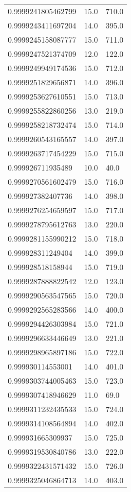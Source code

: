 \begin{center}
\begin{supertabular}[H]{p{0.30\textwidth}p{0.05\textwidth}p{0.05\textwidth}}
0.9999241805462799 & 15.0 & 710.0 \\ 
0.9999243411697204 & 14.0 & 395.0 \\ 
0.9999245158087777 & 15.0 & 711.0 \\ 
0.9999247521374709 & 12.0 & 122.0 \\ 
0.9999249949174536 & 15.0 & 712.0 \\ 
0.9999251829656871 & 14.0 & 396.0 \\ 
0.9999253627610551 & 15.0 & 713.0 \\ 
0.9999255822860256 & 13.0 & 219.0 \\ 
0.9999258218732474 & 15.0 & 714.0 \\ 
0.9999260543165557 & 14.0 & 397.0 \\ 
0.9999263717454229 & 15.0 & 715.0 \\ 
0.999926711935489 & 10.0 & 40.0 \\ 
0.9999270561602479 & 15.0 & 716.0 \\ 
0.999927382407736 & 14.0 & 398.0 \\ 
0.9999276254659597 & 15.0 & 717.0 \\ 
0.9999278795612763 & 13.0 & 220.0 \\ 
0.9999281155990212 & 15.0 & 718.0 \\ 
0.999928311249404 & 14.0 & 399.0 \\ 
0.999928518158944 & 15.0 & 719.0 \\ 
0.9999287888822542 & 12.0 & 123.0 \\ 
0.9999290563547565 & 15.0 & 720.0 \\ 
0.9999292565283566 & 14.0 & 400.0 \\ 
0.9999294426303984 & 15.0 & 721.0 \\ 
0.9999296633446649 & 13.0 & 221.0 \\ 
0.9999298965897186 & 15.0 & 722.0 \\ 
0.999930114553001 & 14.0 & 401.0 \\ 
0.9999303744005463 & 15.0 & 723.0 \\ 
0.9999307418946629 & 11.0 & 69.0 \\ 
0.9999311232435533 & 15.0 & 724.0 \\ 
0.9999314108564894 & 14.0 & 402.0 \\ 
0.999931665309937 & 15.0 & 725.0 \\ 
0.9999319530840786 & 13.0 & 222.0 \\ 
0.9999322431571432 & 15.0 & 726.0 \\ 
0.9999325046864713 & 14.0 & 403.0 \\ 

\end{supertabular}
\end{center}
